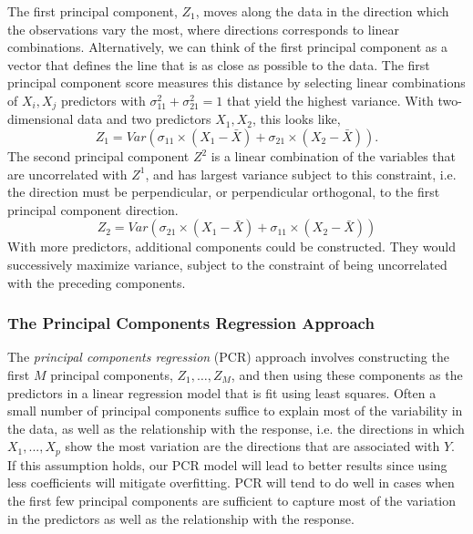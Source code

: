 \documentclass{article}
\numberwithin{equation}{section}
\begin{document}
\begin{enumerate}
The first principal component, $Z_1$, moves along the  data in the direction which the observations vary the most, where directions corresponds to linear combinations. Alternatively, we can think of the first principal component as a vector that defines the line that is as close as possible to the data. The first principal component score measures this distance by selecting linear combinations of $X_i, X_j$ predictors with $\sigma_{11}^2 + \sigma_{21}^2 = 1$ that yield the highest variance. With two-dimensional data and two predictors $X_1, X_2$, this looks like,
\begin{equation}
    Z_1 = Var(\sigma_{11} \times (X_1 - \bar X )  + \sigma_{21} \times (X_2  - \bar X)).
\end{equation}
The second principal component $Z^2$ is a linear combination of the variables that are uncorrelated with $Z^1$, and has largest variance subject to this constraint, i.e. the direction must be perpendicular, or perpendicular orthogonal, to the first principal component direction.
\begin{equation}
    Z_2 = Var(\sigma_{21} \times (X_1 - \bar X )  + \sigma_{11} \times (X_2  - \bar X)) 
\end{equation}
With more predictors, additional components could be constructed.  They would successively maximize variance, subject to the constraint of being uncorrelated with the preceding components.

\subsubsection*{The Principal Components Regression Approach}

The \textit{principal components regression} (PCR) approach involves constructing the first $M$ principal components, $Z_1,\dots,Z_M$, and then using these components as the predictors in a linear regression model that is fit using least squares.  Often a small number of principal components suffice to explain most of the variability in the data, as well as the relationship with the response, i.e. the directions in which $X_1,...,X_p$ show the most variation are the directions that are associated with $Y$. If this assumption holds, our PCR model will lead to better results since using less coefficients will mitigate overfitting. PCR will tend to do well in cases when the first few principal components are sufficient to capture most of the variation in the predictors as well as the relationship with the response.


\end{enumerate}
\end{document}
